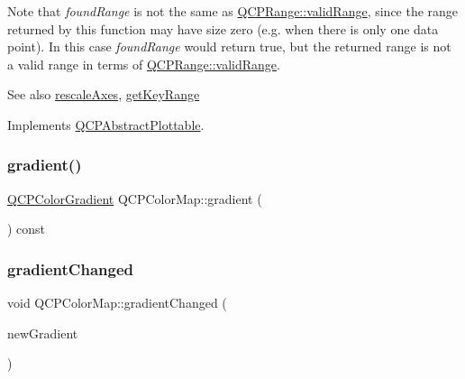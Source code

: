Note that {\itshape found\+Range} is not the same as \mbox{\hyperlink{class_q_c_p_range_ab38bd4841c77c7bb86c9eea0f142dcc0}{Q\+C\+P\+Range\+::valid\+Range}}, since the range returned by this function may have size zero (e.\+g. when there is only one data point). In this case {\itshape found\+Range} would return true, but the returned range is not a valid range in terms of \mbox{\hyperlink{class_q_c_p_range_ab38bd4841c77c7bb86c9eea0f142dcc0}{Q\+C\+P\+Range\+::valid\+Range}}.

\begin{DoxySeeAlso}{See also}
\mbox{\hyperlink{class_q_c_p_abstract_plottable_a1491c4a606bccd2d09e65e11b79eb882}{rescale\+Axes}}, \mbox{\hyperlink{class_q_c_p_color_map_a985861974560f950af6cb7fae8c46267}{get\+Key\+Range}} 
\end{DoxySeeAlso}


Implements \mbox{\hyperlink{class_q_c_p_abstract_plottable_a4de773988b21ed090fddd27c6a3a3dcb}{Q\+C\+P\+Abstract\+Plottable}}.

\mbox{\label{class_q_c_p_color_map_acc4bb87c903607b96c08d2bc34bc24cd}} 
\subsubsection{\texorpdfstring{gradient()}{gradient()}}
{\footnotesize\ttfamily \mbox{\hyperlink{class_q_c_p_color_gradient}{Q\+C\+P\+Color\+Gradient}} Q\+C\+P\+Color\+Map\+::gradient (\begin{DoxyParamCaption}{ }\end{DoxyParamCaption}) const\hspace{0.3cm}{\ttfamily [inline]}}

\mbox{\label{class_q_c_p_color_map_a31a12726736b1ac274e7b1d8dfb67468}} 
\subsubsection{\texorpdfstring{gradientChanged}{gradientChanged}}
{\footnotesize\ttfamily void Q\+C\+P\+Color\+Map\+::gradient\+Changed (\begin{DoxyParamCaption}\item[{const \mbox{\hyperlink{class_q_c_p_color_gradient}{Q\+C\+P\+Color\+Gradient}} \&}]{new\+Gradient }\end{DoxyParamCaption})\hspace{0.3cm}{\ttfamily [signal]}}

